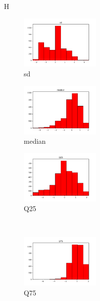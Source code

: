 \documentclass[a4paper]{article}    %
\begin{document}

\begin{figure}{H}
    \centering
    \begin{subfigure}{0.32\textwidth}
        \centering
        \includegraphics[width=3.85cm]{std_0_sd}
        \caption{sd}
        \label{fig:sub_std_1}
    \end{subfigure}
    \hfill
    \begin{subfigure}{0.32\textwidth}
        \centering
        \includegraphics[width=3.85cm]{std_1_median}
        \caption{median}
        \label{fig:sub_std_2}
    \end{subfigure}
    \hfill
    \begin{subfigure}{0.32\textwidth}
        \centering
        \includegraphics[width=3.85cm]{std_2_Q25}
        \caption{Q25}
        \label{fig:sub_std_3}
    \end{subfigure}%
    \\
    \begin{subfigure}{0.32\textwidth}
        \centering
        \includegraphics[width=3.85cm]{std_3_Q75}
        \caption{Q75}
        \label{fig:sub_std_4}
    \end{subfigure}\hfill
    \begin{subfigure}{0.32\textwidth}
        \centering

\end{subfigure}
\end{figure}
\end{document}
